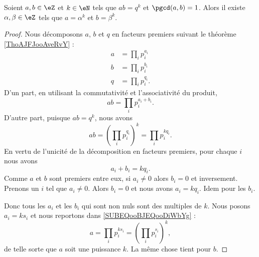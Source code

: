 \begin{lemma}        \label{LEMooEVIZooPAkQZW}
	Soient \( a,b\in \eZ\) et \( k\in \eN\) tels que \( ab=q^k\) et \( \pgcd(a,b)=1\). Alors il existe \( \alpha,\beta\in\eZ\) tels que \( a=\alpha^k\) et \( b=\beta^k\).
\end{lemma}

\begin{proof}
	Nous décomposons \( a\), \( b\) et \( q\) en facteurs premiers suivant le théorème \ref{ThoAJFJooAveRvY} :
	\begin{subequations}
		\begin{align}
			a & = \prod_ip_i^{a_i}      \label{SUBEQooBJEQooDiWbYg} \\
			b & = \prod_ip_i^{b_i}                                  \\
			q & = \prod_{i}p_i^{q_i}.
		\end{align}
	\end{subequations}
	D'un part, en utilisant la commutativité et l'associativité du produit,
	\begin{equation}
		ab=\prod_ip_i^{a_i+b_i}.
	\end{equation}
	D'autre part, puisque \( ab=q^k\), nous avons
	\begin{equation}
		ab=(\prod_ip_i^{q_i})^k=\prod_ip_i^{kq_i}.
	\end{equation}
	En vertu de l'unicité de la décomposition en facteurs premiers, pour chaque \( i\) nous avons
	\begin{equation}
		a_i+b_i=kq_i.
	\end{equation}
	Comme \( a\) et \( b\) sont premiers entre eux, si \( a_i\neq0\) alors \( b_i=0\) et inversement. Prenons un \( i\) tel que \( a_i\neq 0\). Alors \( b_i=0\) et nous avons \( a_i=kq_i\). Idem pour les \( b_i\).

	Donc tous les \( a_i\) et les \( b_i\) qui sont non nuls sont des multiples de \( k\). Nous posons \( a_i=ks_i\) et nous reportons dans \eqref{SUBEQooBJEQooDiWbYg} :
	\begin{equation}
		a=\prod_ip_i^{ks_i}=(\prod_ip_i^{s_i})^k,
	\end{equation}
	de telle sorte que \( a\) soit une puissance \( k\)\ieme. La même chose tient pour \( b\).
\end{proof}

